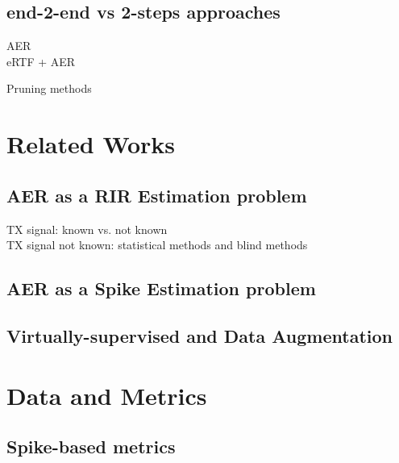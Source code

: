\subsection{end-2-end vs 2-steps approaches}

AER\\
eRTF + AER

Pruning methods

\section{Related Works}

\subsection{AER as a RIR Estimation problem}

TX signal: known vs. not known
\\TX signal not known: statistical methods and blind methods

\subsection{AER as a Spike Estimation problem}


\subsection{Virtually-supervised and Data Augmentation}


\section{Data and Metrics}
\subsection{Spike-based metrics}
